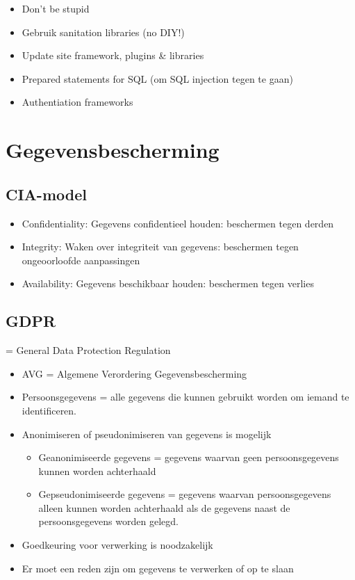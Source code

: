 \documentclass{article}
\begin{document}
\begin{itemize}
    \item Don't be stupid
    \item Gebruik sanitation libraries (no DIY!)
    \item Update site framework, plugins \& libraries
    \item Prepared statements for SQL (om SQL injection tegen te gaan)
    \item Authentiation frameworks
\end{itemize}

\section{Gegevensbescherming}

\subsection{CIA-model}

\begin{itemize}
    \item Confidentiality: Gegevens confidentieel houden: beschermen tegen derden
    \item Integrity: Waken over integriteit van gegevens: beschermen tegen ongeoorloofde aanpassingen
    \item Availability: Gegevens beschikbaar houden: beschermen tegen verlies
\end{itemize}

\subsection{GDPR}

= General Data Protection Regulation

\begin{itemize}
    \item AVG = Algemene Verordering Gegevensbescherming
    \item Persoonsgegevens = alle gegevens die kunnen gebruikt worden om iemand te identificeren.
    \item Anonimiseren of pseudonimiseren van gegevens is mogelijk
    \begin{itemize}
        \item Geanonimiseerde gegevens = gegevens waarvan geen persoonsgegevens kunnen worden achterhaald
        \item Gepseudonimiseerde gegevens = gegevens waarvan persoonsgegevens alleen kunnen worden achterhaald als de gegevens naast de persoonsgegevens worden gelegd.
    \end{itemize}
    \item Goedkeuring voor verwerking is noodzakelijk
    \item Er moet een reden zijn om gegevens te verwerken of op te slaan
\end{itemize}
\end{document}
